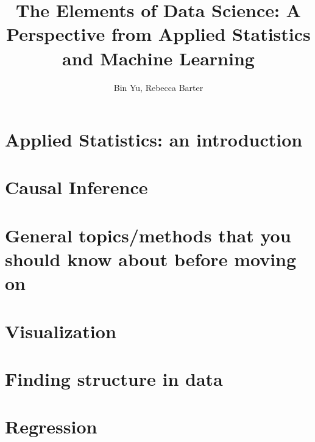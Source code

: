 \documentclass[oneside]{scrbook}
\title{The Elements of Data Science: A Perspective from Applied Statistics and Machine Learning}
\author{Bin Yu, Rebecca Barter}
\begin{document}
 
\maketitle 

\frontmatter 


 
\tableofcontents 


\mainmatter 

\part{Applied Statistics: an introduction}

 










\part{Causal Inference}







\part{General topics/methods that you should know about before moving on}












\part{Visualization}






\part{Finding structure in data}









\part{Regression}
\end{document}
